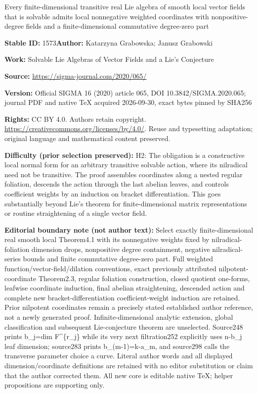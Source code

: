 \documentclass[11pt]{article}
\numberwithin{equation}{section}
\numberwithin{equation}{section}
\begin{document}
\begin{center}\Large Every finite-dimensional transitive real Lie algebra of smooth local vector fields that is solvable admits local nonnegative weighted coordinates with nonpositive-degree fields and a finite-dimensional commutative degree-zero part\end{center}
\noindent\textbf{Stable ID:} 1573\quad\textbf{Author:} Katarzyna Grabowska; Janusz Grabowski\par
\noindent\textbf{Work:} Solvable Lie Algebras of Vector Fields and a Lie's Conjecture\par
\noindent\textbf{Source:} \url{https://sigma-journal.com/2020/065/}\par
\noindent\textbf{Version:} Official SIGMA 16 (2020) article 065, DOI 10.3842/SIGMA.2020.065; journal PDF and native TeX acquired 2026-09-30, exact bytes pinned by SHA256\par
\noindent\textbf{Rights:} CC BY 4.0. Authors retain copyright. \url{https://creativecommons.org/licenses/by/4.0/}. Reuse and typesetting adaptation; original language and mathematical content preserved.\par
\noindent\textbf{Difficulty (prior selection preserved):} {\CJKfont H2: The obligation is a constructive local normal form for an arbitrary transitive solvable action, where its nilradical need not be transitive. The proof assembles coordinates along a nested regular foliation, descends the action through the last abelian leaves, and controls coefficient weights by an induction on bracket differentiation. This goes substantially beyond Lie’s theorem for finite-dimensional matrix representations or routine straightening of a single vector field.}\par
\medskip\noindent\textbf{Editorial boundary note (not author text):} Select exactly finite-dimensional real smooth local Theorem4.1 with its nonnegative weights fixed by nilradical-foliation dimension drops, nonpositive degree containment, negative nilradical-series bounds and finite commutative degree-zero part. Full weighted function/vector-field/dilation conventions, exact previously attributed nilpotent-coordinate Theorem2.3, regular foliation construction, closed quotient one-forms, leafwise coordinate induction, final abelian straightening, descended action and complete new bracket-differentiation coefficient-weight induction are retained. Prior nilpotent coordinates remain a precisely stated established author reference, not a newly generated proof. Infinite-dimensional analytic extension, global classification and subsequent Lie-conjecture theorem are unselected. Source248 prints b\_j=dim F\textasciicircum{}\{r\_j\} while its very next filtration252 explicitly uses n-b\_j leaf dimension; source283 prints b\_(m-1)=k-a\_m, and source298 calls the transverse parameter choice a curve. Literal author words and all displayed dimension/coordinate definitions are retained with no editor substitution or claim that the author corrected them. All new core is editable native TeX; helper propositions are supporting only.\par
\end{document}
